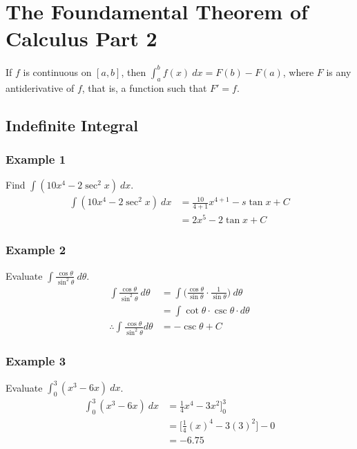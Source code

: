 \documentclass[11pt]{article}
\begin{document}
\pagebreak
\section{The Foundamental Theorem of Calculus Part 2}
\begin{theo}
    If $ f $ is continuous on $ [a,b] $, then $ \displaystyle{\int_{a}^{b}f(x)\ dx=F(b) - F(a)} $, where $ F $ is any\\[2pt] antiderivative of $ f $, that is, a function such that $ F' = f $.
\end{theo}
\subsection{Indefinite Integral}
\subsubsection{Example 1}
Find $ \displaystyle{\int(10x^4-2\sec ^2x)\ dx} $.
\begin{align*}
    \int(10x^4-2\sec ^2x)\ dx
    &= \frac{10}{4+1}x^{4+1}-s\tan x+C\\
    &= 2x^5-2\tan x+C
\end{align*}

\subsubsection{Example 2}
Evaluate $ \displaystyle{\int \frac{\cos \theta}{\sin ^2 \theta}\ d\theta} $.
\begin{align*}
    \int \frac{\cos \theta}{\sin ^2 \theta}\ d\theta
    &= \int \Big(\frac{\cos \theta}{\sin \theta}\cdot \frac{1}{\sin \theta} \Big)\  d\theta\\
    &= \int \cot \theta \cdot \csc \theta \cdot d \theta\\
    \therefore \int \frac{\cos \theta}{\sin ^2 \theta}d \theta &= -\csc \theta + C
\end{align*}

\subsubsection{Example 3}
Evaluate $ \displaystyle{\int_{0}^{3}(x^3-6x)\ dx} $.
\begin{align*}
    \int_{0}^{3}(x^3-6x)\ dx
    &= \frac{1}{4}x^4-3x^2 \bigg]_0^3\\
    &= \Big[ \frac{1}{4}(x)^4 - 3(3)^2 \Big] - 0\\
    &= -6.75
\end{align*}
\end{document}
